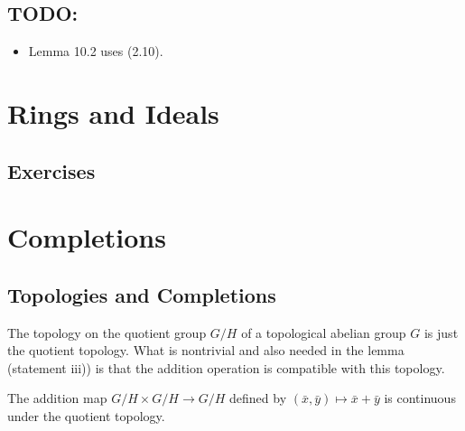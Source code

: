 \documentclass{note}
\begin{document}
\section*{TODO:}

\begin{itemize}
\item Lemma 10.2 uses (2.10).
\end{itemize}


\chapter{Rings and Ideals}

\section*{Exercises}
\setcounter{chapter}{9}


\chapter{Completions}

\section*{Topologies and Completions}

The topology on the quotient group $G/H$ of a topological abelian
group $G$ is just the quotient topology. What is nontrivial and also
needed in the lemma (statement iii)) is that the addition operation is
compatible with this topology.

\begin{lemma*}
  The addition map $G/H \times G/H \to G/H$ defined by
  $(\bar{x},\bar{y}) \mapsto \bar{x}+\bar{y}$ is continuous under the
  quotient topology.
\end{lemma*}

\end{document}
